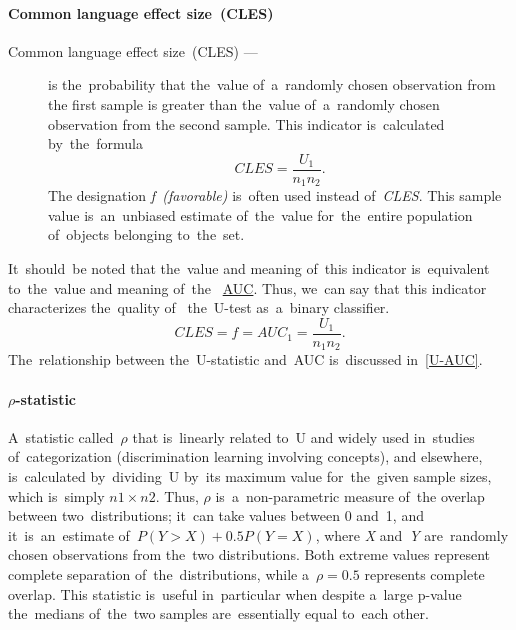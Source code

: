 \documentclass[russian,english]{scrreprt}
\begin{document}
\paragraph{Common language effect size~(CLES)}
\begin{description}
	\item[Common language effect size~(CLES) ---] is the~probability that the~value of~a~randomly chosen observation from the first sample is greater than the~value of~a~randomly chosen observation from the second sample. This indicator is~calculated by~the~formula
	\begin{equation}\label{eq:CLES}
	CLES = \frac{U_{1}}{n_{1}n_{2}}.
	\end{equation}
	The designation \emph{f~(favorable)} is~often used instead of~\emph{CLES}. This sample value is~an~unbiased estimate of~the~value for~the~entire population of~objects belonging to~the~set.	
\end{description}
It~should~be noted that the~value and meaning of~this indicator is~equivalent to~the~value and meaning of~the ~\href{https://en.wikipedia.org/wiki/Receiver_operating_characteristic}{AUC}\cite{Wiki:ROC}. Thus, we~can say that this indicator characterizes the~quality of~ the~U-test as~a~binary classifier.
\begin{equation}\label{eq:AUC}
CLES = f = AUC_{1} = \frac{U_{1}}{n_{1}n_{2}}.
\end{equation}
The~relationship between the~U-statistic and~AUC is~discussed in~\ref{U-AUC}.
%
\paragraph{$\rho$-statistic}
A~statistic called~$\rho$ that is~linearly related to~U and widely used in~studies of~categorization (discrimination learning involving concepts), and elsewhere, is~calculated by~dividing~U by~its maximum value for~the~given sample sizes, which is~simply $n1 \times n2$. Thus, $\rho$ is~a~non-parametric measure of~the overlap between two~distributions; it~can take values between 0 and~1, and it~is~an~estimate of~$P(Y > X) + 0.5 P(Y = X)$, where \textit{X} and~\textit{Y} are~randomly chosen observations from the~two distributions. Both extreme values represent complete separation of~the~distributions, while a~$ρ = 0.5$ represents complete overlap. This statistic is~useful in~particular when despite a~large p-value the~medians of~the~two samples are~essentially equal to~each other. 
%
\end{document}
